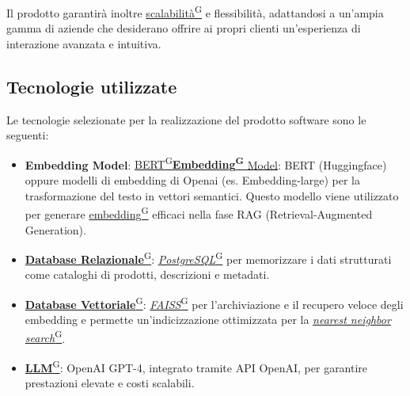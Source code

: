 Il prodotto garantirà inoltre \href{https://code7crusaders.github.io/docs/PB/documentazione_interna/glossario.html#scalabilità}{scalabilità\textsuperscript{G}} e flessibilità, adattandosi a un’ampia gamma di aziende che desiderano offrire ai propri clienti un’esperienza di interazione avanzata e intuitiva.


\subsection{Tecnologie utilizzate}
Le tecnologie selezionate per la realizzazione del prodotto software sono le seguenti:

\begin{itemize}

    \item \textbf{Embedding Model}: \href{https://code7crusaders.github.io/docs/PB/documentazione_interna/glossario.html#bert-bidirectional-encoder-representations-from-transformers}{BERT\textsuperscript{G}}\href{https://code7crusaders.github.io/docs/PB/documentazione_interna/glossario.html#embedding}{\textbf{Embedding\textsuperscript{G}} Model}: BERT (Huggingface) oppure modelli di embedding di Openai (es. Embedding-large) per la trasformazione del testo in vettori semantici. Questo modello viene utilizzato per generare \href{https://code7crusaders.github.io/docs/PB/documentazione_interna/glossario.html#embedding}{embedding\textsuperscript{G}} efficaci nella fase RAG (Retrieval-Augmented Generation).
    \item \href{https://code7crusaders.github.io/docs/PB/documentazione_interna/glossario.html#database-relazionale}{\textbf{Database Relazionale}\textsuperscript{G}}: \href{https://code7crusaders.github.io/docs/PB/documentazione_interna/glossario.html#postgresql}{\textit{PostgreSQL}\textsuperscript{G}} per memorizzare i dati strutturati come cataloghi di prodotti, descrizioni e metadati.
    \item \href{https://code7crusaders.github.io/docs/PB/documentazione_interna/glossario.html#database-vettoriale}{\textbf{Database Vettoriale}\textsuperscript{G}}: \href{https://code7crusaders.github.io/docs/PB/documentazione_interna/glossario.html#faiss}{\textit{FAISS}\textsuperscript{G}} per l'archiviazione e il recupero veloce degli embedding e permette un'indicizzazione ottimizzata per la \href{https://code7crusaders.github.io/docs/PB/documentazione_interna/glossario.html#nearest-neighbor-search-nns}{\textit{nearest neighbor search}\textsuperscript{G}}.
    \item \href{https://code7crusaders.github.io/docs/PB/documentazione_interna/glossario.html#llm-large-language-model}{\textbf{LLM}\textsuperscript{G}}: OpenAI GPT-4, integrato tramite API OpenAI, per garantire prestazioni elevate e costi scalabili.

\end{itemize}
